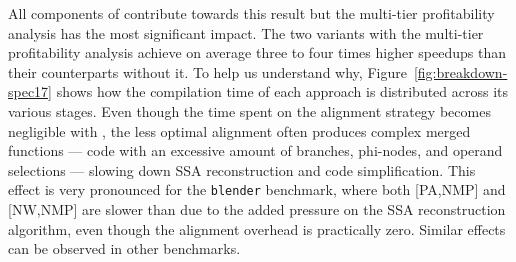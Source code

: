 
All components of {\ProjName} contribute towards this result but the multi-tier profitability analysis has the most significant impact. The two variants with the multi-tier profitability analysis achieve on average three to four times higher speedups than their counterparts without it.
To help us understand why, Figure~\ref{fig:breakdown-spec17} shows how the compilation time of each approach is distributed across its various stages. 
Even though the time spent on the alignment strategy becomes negligible with {\ProjName}, the less optimal alignment often produces complex merged functions --- code with an excessive amount of branches, phi-nodes, and operand selections --- slowing down SSA reconstruction and code simplification. This effect is very pronounced for the \texttt{blender} benchmark, where both [PA,NMP] and [NW,NMP] are slower than {\SOAName} due to the added pressure on the SSA reconstruction algorithm, even though the alignment overhead is practically zero.
Similar effects can be observed in other benchmarks.


